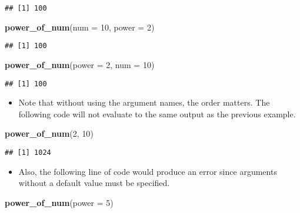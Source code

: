 \documentclass[]{book}
\newenvironment{Shaded}{\begin{snugshade}}{\end{snugshade}}
\newcommand{\DataTypeTok}[1]{\textcolor[rgb]{0.13,0.29,0.53}{#1}}
\newcommand{\DecValTok}[1]{\textcolor[rgb]{0.00,0.00,0.81}{#1}}
\newcommand{\KeywordTok}[1]{\textcolor[rgb]{0.13,0.29,0.53}{\textbf{#1}}}
\newcommand{\NormalTok}[1]{#1}
\providecommand{\tightlist}{%
  \setlength{\itemsep}{0pt}\setlength{\parskip}{0pt}}
\begin{document}
\begin{verbatim}
## [1] 100
\end{verbatim}

\begin{Shaded}
\begin{Highlighting}[]
\KeywordTok{power_of_num}\NormalTok{(}\DataTypeTok{num =} \DecValTok{10}\NormalTok{, }\DataTypeTok{power =} \DecValTok{2}\NormalTok{)}
\end{Highlighting}
\end{Shaded}

\begin{verbatim}
## [1] 100
\end{verbatim}

\begin{Shaded}
\begin{Highlighting}[]
\KeywordTok{power_of_num}\NormalTok{(}\DataTypeTok{power =} \DecValTok{2}\NormalTok{, }\DataTypeTok{num =} \DecValTok{10}\NormalTok{)}
\end{Highlighting}
\end{Shaded}

\begin{verbatim}
## [1] 100
\end{verbatim}

\begin{itemize}
\tightlist
\item
  Note that without using the argument names, the order matters. The following code will not evaluate to the same output as the previous example.
\end{itemize}

\begin{Shaded}
\begin{Highlighting}[]
\KeywordTok{power_of_num}\NormalTok{(}\DecValTok{2}\NormalTok{, }\DecValTok{10}\NormalTok{)}
\end{Highlighting}
\end{Shaded}

\begin{verbatim}
## [1] 1024
\end{verbatim}

\begin{itemize}
\tightlist
\item
  Also, the following line of code would produce an error since arguments without a default value must be specified.
\end{itemize}

\begin{Shaded}
\begin{Highlighting}[]
\KeywordTok{power_of_num}\NormalTok{(}\DataTypeTok{power =} \DecValTok{5}\NormalTok{)}
\end{Highlighting}
\end{Shaded}
\end{document}
